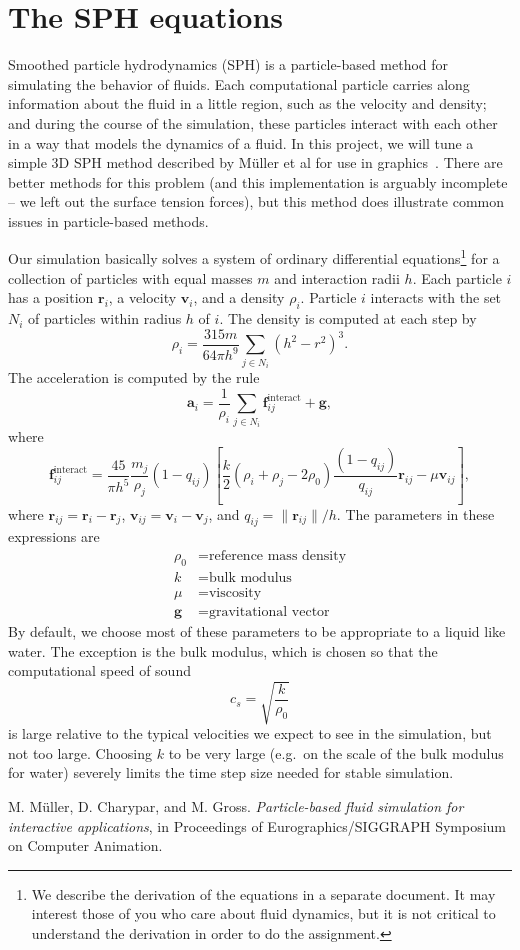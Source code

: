 \documentclass[10pt, leqno]{article} %
\newcommand{\bfr}{\mathbf{r}}
\newcommand{\bfv}{\mathbf{v}}
\newcommand{\bfa}{\mathbf{a}}
\newcommand{\bff}{\mathbf{f}}
\newcommand{\bfg}{\mathbf{g}}
\begin{document}
\pagestyle{fancy}
\fancyfoot{}

\section{The SPH equations}

Smoothed particle hydrodynamics (SPH) is a particle-based method for
simulating the behavior of fluids.  Each computational particle
carries along information about the fluid in a little region, such as
the velocity and density; and during the course of the simulation,
these particles interact with each other in a way that models the
dynamics of a fluid.  In this project, we will tune a simple 3D 
SPH method described by M\"uller et al for use in
graphics~\cite{muller}.  There are better methods for this problem
(and this implementation is arguably incomplete -- we left out the
surface tension forces), but this method does illustrate common issues
in particle-based methods.

Our simulation basically solves a system of ordinary differential
equations\footnote{%
  We describe the derivation of the equations in a separate document.
  It may interest those of you who care about fluid dynamics, but it is
  not critical to understand the derivation in order to do the assignment.
}
for a collection of particles with equal masses $m$ and
interaction radii $h$.  Each particle $i$ has a position $\bfr_i$,
a velocity $\bfv_i$, and a density $\rho_i$.  Particle $i$ interacts
with the set $N_i$ of particles within radius $h$ of $i$.
The density is computed at each step by
\[
  \rho_i = \frac{315m}{64\pi h^9} \sum_{j \in N_i} (h^2 - r^2)^3.
\]
The acceleration is computed by the rule
\[
  \bfa_i = \frac{1}{\rho_i} \sum_{j \in N_i} \bff_{ij}^{\mathrm{interact}} + \bfg,
\]
where
\[
  \bff_{ij}^{\mathrm{interact}} =
  \frac{45}{\pi h^5} \frac{m_j}{\rho_j} (1-q_{ij}) \left[
    \frac{k}{2} (\rho_i + \rho_j - 2 \rho_0) \frac{(1-q_{ij})}{q_{ij}} \bfr_{ij} -
    \mu \bfv_{ij}
  \right],
\]
where $\bfr_{ij} = \bfr_i-\bfr_j$, $\bfv_{ij} = \bfv_i-\bfv_j$,
and $q_{ij} = \|\bfr_{ij}\|/h$.  The parameters in these expressions are
\begin{align*}
  \rho_0 &= \mbox{reference mass density} \\
  k      &= \mbox{bulk modulus} \\
  \mu    &= \mbox{viscosity} \\
  \bfg   &= \mbox{gravitational vector}
\end{align*}
By default, we choose most of these parameters to be appropriate to a liquid
like water.  The exception is the bulk modulus, which is chosen so that the
computational speed of sound
\[
  c_s = \sqrt{\frac{k}{\rho_0}}
\]
is large relative to the typical velocities we expect to see in the
simulation, but not too large.  Choosing $k$ to be very large (e.g.~on
the scale of the bulk modulus for water) severely limits the time step
size needed for stable simulation.



\begin{thebibliography}{10}

{\sc M. M\"uller, D. Charypar, and M. Gross}.
{\em Particle-based fluid simulation for interactive applications},
in Proceedings of Eurographics/SIGGRAPH Symposium on Computer Animation.

\end{thebibliography}
\end{document}
